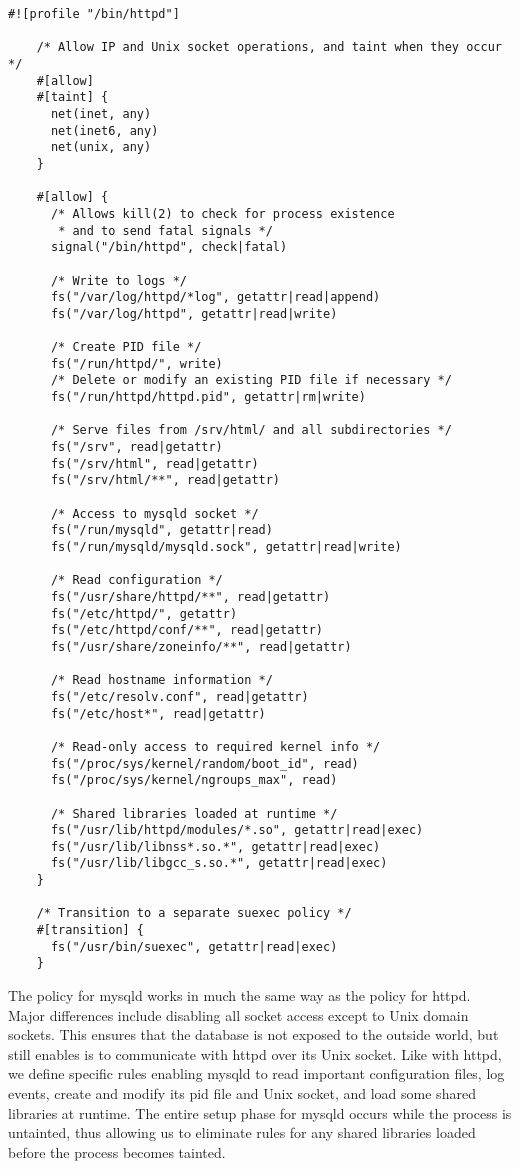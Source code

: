 \begin{lstlisting}[language=bpfbox, gobble=4, float=false, caption={[A \bpfbox{} policy for Apache httpd]
  A \bpfbox{} policy for Apache httpd.
  %\todo{Describe this}
}, label={lst:bpfbox-apache}]
    #![profile "/bin/httpd"]

    /* Allow IP and Unix socket operations, and taint when they occur */
    #[allow]
    #[taint] {
      net(inet, any)
      net(inet6, any)
      net(unix, any)
    }

    #[allow] {
      /* Allows kill(2) to check for process existence
       * and to send fatal signals */
      signal("/bin/httpd", check|fatal)

      /* Write to logs */
      fs("/var/log/httpd/*log", getattr|read|append)
      fs("/var/log/httpd", getattr|read|write)

      /* Create PID file */
      fs("/run/httpd/", write)
      /* Delete or modify an existing PID file if necessary */
      fs("/run/httpd/httpd.pid", getattr|rm|write)

      /* Serve files from /srv/html/ and all subdirectories */
      fs("/srv", read|getattr)
      fs("/srv/html", read|getattr)
      fs("/srv/html/**", read|getattr)

      /* Access to mysqld socket */
      fs("/run/mysqld", getattr|read)
      fs("/run/mysqld/mysqld.sock", getattr|read|write)

      /* Read configuration */
      fs("/usr/share/httpd/**", read|getattr)
      fs("/etc/httpd/", getattr)
      fs("/etc/httpd/conf/**", read|getattr)
      fs("/usr/share/zoneinfo/**", read|getattr)

      /* Read hostname information */
      fs("/etc/resolv.conf", read|getattr)
      fs("/etc/host*", read|getattr)

      /* Read-only access to required kernel info */
      fs("/proc/sys/kernel/random/boot_id", read)
      fs("/proc/sys/kernel/ngroups_max", read)

      /* Shared libraries loaded at runtime */
      fs("/usr/lib/httpd/modules/*.so", getattr|read|exec)
      fs("/usr/lib/libnss*.so.*", getattr|read|exec)
      fs("/usr/lib/libgcc_s.so.*", getattr|read|exec)
    }

    /* Transition to a separate suexec policy */
    #[transition] {
      fs("/usr/bin/suexec", getattr|read|exec)
    }
\end{lstlisting}

The \bpfbox{} policy for mysqld works in much the same way as the policy for httpd. Major
differences include disabling all socket access except to Unix domain sockets. This
ensures that the database is not exposed to the outside world, but still enables is to
communicate with httpd over its Unix socket. Like with httpd, we define specific rules
enabling mysqld to read important configuration files, log events, create and modify its
\gls{pid} file and Unix socket, and load some shared libraries at runtime. The entire
setup phase for mysqld occurs while the process is untainted, thus allowing us to
eliminate rules for any shared libraries loaded before the process becomes tainted.


